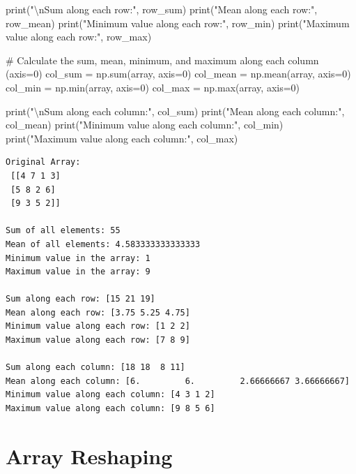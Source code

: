 \documentclass[
  letterpaper,
  DIV=11,
  numbers=noendperiod]{scrreprt}
\newenvironment{Shaded}{\begin{snugshade}}{\end{snugshade}}
\newcommand{\BuiltInTok}[1]{\textcolor[rgb]{0.00,0.23,0.31}{#1}}
\newcommand{\CharTok}[1]{\textcolor[rgb]{0.13,0.47,0.30}{#1}}
\newcommand{\CommentTok}[1]{\textcolor[rgb]{0.37,0.37,0.37}{#1}}
\newcommand{\DecValTok}[1]{\textcolor[rgb]{0.68,0.00,0.00}{#1}}
\newcommand{\NormalTok}[1]{\textcolor[rgb]{0.00,0.23,0.31}{#1}}
\newcommand{\OperatorTok}[1]{\textcolor[rgb]{0.37,0.37,0.37}{#1}}
\newcommand{\StringTok}[1]{\textcolor[rgb]{0.13,0.47,0.30}{#1}}
\begin{document}
\begin{Shaded}
\begin{Highlighting}[]
\BuiltInTok{print}\NormalTok{(}\StringTok{"}\CharTok{\textbackslash{}n}\StringTok{Sum along each row:"}\NormalTok{, row\_sum)  }
\BuiltInTok{print}\NormalTok{(}\StringTok{"Mean along each row:"}\NormalTok{, row\_mean)  }
\BuiltInTok{print}\NormalTok{(}\StringTok{"Minimum value along each row:"}\NormalTok{, row\_min)  }
\BuiltInTok{print}\NormalTok{(}\StringTok{"Maximum value along each row:"}\NormalTok{, row\_max)  }

\CommentTok{\# Calculate the sum, mean, minimum, and maximum along each column (axis=0)}
\NormalTok{col\_sum }\OperatorTok{=}\NormalTok{ np.}\BuiltInTok{sum}\NormalTok{(array, axis}\OperatorTok{=}\DecValTok{0}\NormalTok{)}
\NormalTok{col\_mean }\OperatorTok{=}\NormalTok{ np.mean(array, axis}\OperatorTok{=}\DecValTok{0}\NormalTok{)}
\NormalTok{col\_min }\OperatorTok{=}\NormalTok{ np.}\BuiltInTok{min}\NormalTok{(array, axis}\OperatorTok{=}\DecValTok{0}\NormalTok{)}
\NormalTok{col\_max }\OperatorTok{=}\NormalTok{ np.}\BuiltInTok{max}\NormalTok{(array, axis}\OperatorTok{=}\DecValTok{0}\NormalTok{)}

\BuiltInTok{print}\NormalTok{(}\StringTok{"}\CharTok{\textbackslash{}n}\StringTok{Sum along each column:"}\NormalTok{, col\_sum)  }
\BuiltInTok{print}\NormalTok{(}\StringTok{"Mean along each column:"}\NormalTok{, col\_mean)  }
\BuiltInTok{print}\NormalTok{(}\StringTok{"Minimum value along each column:"}\NormalTok{, col\_min)  }
\BuiltInTok{print}\NormalTok{(}\StringTok{"Maximum value along each column:"}\NormalTok{, col\_max)  }
\end{Highlighting}
\end{Shaded}

\begin{verbatim}
Original Array:
 [[4 7 1 3]
 [5 8 2 6]
 [9 3 5 2]]

Sum of all elements: 55
Mean of all elements: 4.583333333333333
Minimum value in the array: 1
Maximum value in the array: 9

Sum along each row: [15 21 19]
Mean along each row: [3.75 5.25 4.75]
Minimum value along each row: [1 2 2]
Maximum value along each row: [7 8 9]

Sum along each column: [18 18  8 11]
Mean along each column: [6.         6.         2.66666667 3.66666667]
Minimum value along each column: [4 3 1 2]
Maximum value along each column: [9 8 5 6]
\end{verbatim}

\hypertarget{array-reshaping}{%
\section{Array Reshaping}\label{array-reshaping}}
\end{document}
